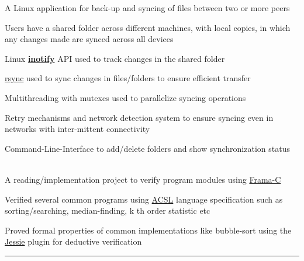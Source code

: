 \documentclass[letterpaper]{Formatting}
\begin{document}
\begin{minipage}[t]{0.66\textwidth}
A Linux application for back-up and syncing of files between two or more peers
\vspace{\topsep} %
\footnotesize{
\begin{tightitemize}
\item Users have a shared folder across different machines, with local copies, in which any changes made are synced across all devices
\item Linux \href{http://man7.org/linux/man-pages/man7/inotify.7.html}{\textbf{inotify}} API used to track changes in the shared folder
\item \href{http://linux.about.com/library/cmd/blcmdl1_rsync.htm}{rsync} used to sync changes in files/folders to ensure efficient transfer
\item Multithreading with mutexes used to parallelize syncing operations
\item Retry mechanisms and network detection system to ensure syncing even in networks with inter-mittent connectivity
\item Command-Line-Interface to add/delete folders and show synchronization status
\end{tightitemize}
}
\sectionspace %
\vspace{2ex}
\\
\vspace{1ex}
A reading/implementation project to verify program modules using \href{http://frama-c.com/}{Frama-C}
\vspace{\topsep}
\footnotesize{
\begin{tightitemize}
\item Verified several common programs using \href{frama-c.com/acsl.html}{ACSL} language specification such as sorting/searching, median-finding, k th order statistic etc
\item Proved formal properties of common implementations like bubble-sort using the \href{krakatoa.lri.fr/jessie.pdf}{Jessie} plugin for deductive verification
\end{tightitemize}
}
\sectionspace
\vspace{2ex}
\rule{12cm}{0.5pt}

\vspace{3.9ex}

\end{minipage}
\end{document}
